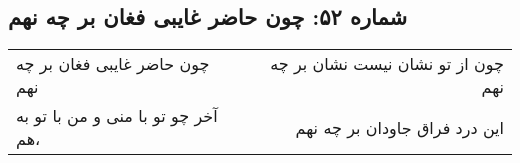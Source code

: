 \begin{center}
\section*{شماره ۵۲: چون حاضر غایبی فغان بر چه نهم}
\label{sec:052}
\begin{longtable}{l p{0.5cm} r}
چون حاضر غایبی فغان بر چه نهم
&&
چون از تو نشان نیست نشان بر چه نهم
\\
آخر چو تو با منی و من با تو به هم،
&&
این درد فراق جاودان بر چه نهم
\\
\end{longtable}
\end{center}
